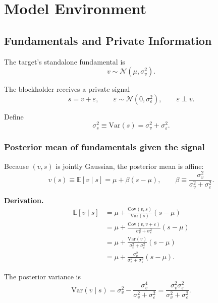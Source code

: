 \documentclass[11pt,a4paper]{article}
\theoremstyle{definition}
\theoremstyle{plain}
\theoremstyle{remark}
\newcommand{\E}{\mathbb{E}}
\newcommand{\Var}{\mathrm{Var}}
\newcommand{\Cov}{\mathrm{Cov}}
\newcommand{\1}{\mathbf{1}}
\begin{document}
\section{Model Environment}

\subsection{Fundamentals and Private Information}

The target's standalone fundamental is
\begin{equation}
v \sim \mathcal{N}(\mu,\sigma_v^2).
\label{eq:v-dist}
\end{equation}

The blockholder receives a private signal
\begin{equation}
s = v + \varepsilon,
\qquad
\varepsilon \sim \mathcal{N}(0,\sigma_\varepsilon^2),
\qquad
\varepsilon \perp v.
\label{eq:s-def}
\end{equation}

Define
\begin{equation}
\sigma_s^2 \equiv \Var(s) = \sigma_v^2 + \sigma_\varepsilon^2.
\label{eq:s-var}
\end{equation}

\subsubsection*{Posterior mean of fundamentals given the signal}

Because $(v,s)$ is jointly Gaussian, the posterior mean is affine:
\begin{equation}
\hat v(s) \equiv \E[v \mid s] = \mu + \beta (s-\mu),
\qquad
\beta \equiv \frac{\sigma_v^2}{\sigma_v^2+\sigma_\varepsilon^2}.
\label{eq:posterior-mean}
\end{equation}

\textbf{Derivation.}
\begin{align}
\E[v\mid s]
&= \mu + \frac{\Cov(v,s)}{\Var(s)}(s-\mu) \nonumber \\
&= \mu + \frac{\Cov(v,v+\varepsilon)}{\sigma_v^2+\sigma_\varepsilon^2}(s-\mu) \nonumber \\
&= \mu + \frac{\Var(v)}{\sigma_v^2+\sigma_\varepsilon^2}(s-\mu) \nonumber \\
&= \mu + \frac{\sigma_v^2}{\sigma_v^2+\sigma_\varepsilon^2}(s-\mu).
\label{eq:posterior-mean-derivation}
\end{align}

The posterior variance is
\begin{equation}
\Var(v\mid s)
= \sigma_v^2 - \frac{\sigma_v^4}{\sigma_v^2+\sigma_\varepsilon^2}
= \frac{\sigma_v^2 \sigma_\varepsilon^2}{\sigma_v^2+\sigma_\varepsilon^2}.
\label{eq:posterior-var}
\end{equation}
\end{document}

